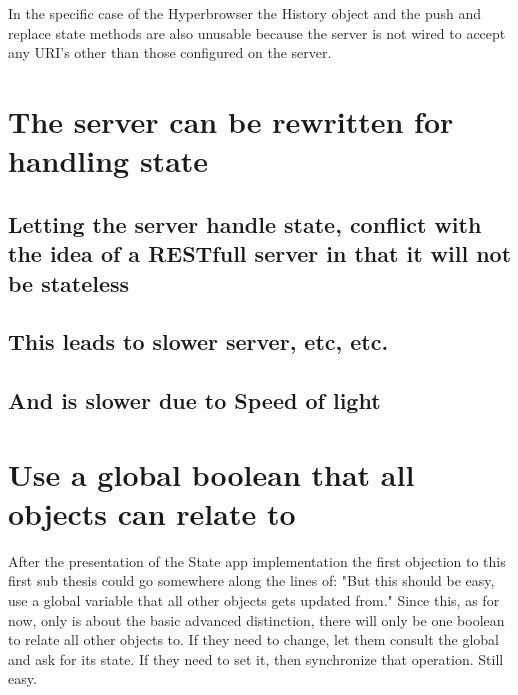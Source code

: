 \documentclass[english]{ifimaster}
\begin{document}
In the specific case of the Hyperbrowser the History object and the push and replace state methods are also unusable because the server is not wired to accept any URI's other than those configured on the server.



\section{The server can be rewritten for handling state}
\subsection{Letting the server handle state, conflict with the idea of a RESTfull server in that it will not be stateless}
\subsection{This leads to slower server, etc, etc.}
\subsection{And is slower due to Speed of light}

\section{Use a global boolean that all objects can relate to}
After the presentation of the State app implementation the first objection to this first sub thesis could go somewhere along the lines of: "But this should be easy, use a global variable that all other objects gets updated from." Since this, as for now, only is about the basic advanced distinction, there will only be one boolean to relate all other objects to. If they need to change, let them consult the global and ask for its state. If they need to set it, then synchronize that operation. Still easy.
\end{document}

